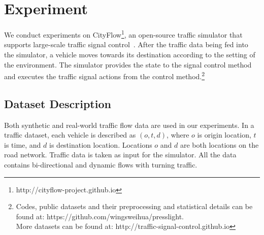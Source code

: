 \section{Experiment}
We conduct experiments on CityFlow\footnote{http://cityflow-project.github.io}, an open-source traffic simulator that supports large-scale traffic signal control~\cite{huichu19}. After the traffic data being fed into the simulator, a vehicle moves towards its destination according to the setting of the environment. The simulator provides the state to the signal control method and executes the traffic signal actions from the control method.\footnote{Codes, public datasets and their preprocessing and
statistical details can be found at: https://github.com/wingsweihua/presslight. \\More datasets can be found at: http://traffic-signal-control.github.io}

\subsection{Dataset Description}
Both synthetic and real-world traffic flow data are used in our experiments. In a traffic dataset, each vehicle is described as $(o, t, d)$, where $o$ is  origin location, $t$ is  time, and $d$ is  destination location. Locations $o$ and $d$ are both locations on the road network. Traffic data is taken as input for the simulator. All the data contains bi-directional and dynamic flows with turning traffic. 

